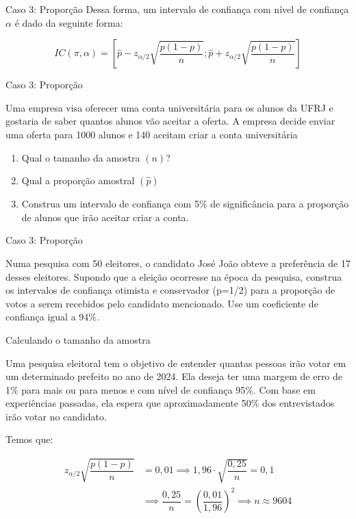 \begin{frame}{Caso 3: Proporção}
    Dessa forma, um intervalo de confiança com nível de confiança $\alpha$ é dado da seguinte forma:

    $$IC(\pi, \alpha) = \left[ \hat{p} - z_{\alpha/2}\sqrt{\dfrac{p(1-p)}{n}} ; \hat{p}+ z_{\alpha/2}\sqrt{\dfrac{p(1-p)}{n}}\right]$$
\end{frame}

\begin{frame}{Caso 3: Proporção}
    \begin{exemplo}
        Uma empresa visa oferecer uma conta universitária para os alunos da UFRJ e gostaria de saber quantos alunos vão aceitar a oferta. A empresa decide enviar uma oferta para 1000 alunos e 140 aceitam criar a conta universitária

        \begin{enumerate}
            \item Qual o tamanho da amostra $(n)$?
            \item Qual a proporção amostral $(\hat{p})$
            \item Construa um intervalo de confiança com 5\% de significância para a proporção de alunos que irão aceitar criar a conta. 
        \end{enumerate}
    \end{exemplo}
\end{frame}

\begin{frame}{Caso 3: Proporção}
    \begin{exemplo}
         Numa pesquisa com 50 eleitores, o candidato José João obteve a preferência de
17 desses eleitores. Supondo que a eleição ocorresse na época da pesquisa,
construa os intervalos de confiança otimista e conservador (p=1/2) para a proporção de
votos a serem recebidos pelo candidato mencionado. Use um coeficiente de
confiança igual a 94\%.
    \end{exemplo}
\end{frame}

\begin{frame}{Calculando o tamanho da amostra}
    \begin{exemplo}
        Uma pesquisa eleitoral tem o objetivo de entender quantas pessoas irão votar em um determinado prefeito no ano de 2024. Ela deseja ter uma margem 
        de erro de 1\% para mais ou para menos e com nível de confiança 95\%. Com base em experiências passadas, ela espera que aproximadamente 50\% dos entrevistados irão votar no candidato.

        \pause

        Temos que:

\begin{align*}
    z_{\alpha/2}\sqrt{\dfrac{p(1-p)}{n}} &= 0,01 \implies 1,96 \cdot \sqrt{\dfrac{0,25}{n}} = 0,1\\
    & \implies \dfrac{0,25}{n} = \left(\dfrac{0,01}{1,96}\right)^2 \implies n \approx 9604 
\end{align*}
    \end{exemplo}
\end{frame}

